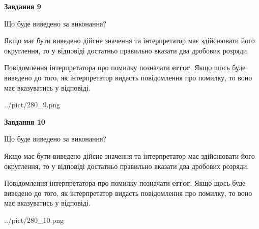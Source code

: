 \documentclass[12pt, ukrainian]{article}
\begin{document}
{\begin {Large}
{\begin {center}\textbf{Завдання 9}\end {center}}\par
Що буде виведено за виконання? \par

Якщо має бути виведено дійсне значення та інтерпретатор має здійснювати його округлення, 
то у відповіді достатньо правильно вказати два дробових розряди.

Повідомлення інтерпретатора про помилку позначати \textbf{error}.
Якщо щось буде виведено до того, як інтерпретатор видасть повідомлення про помилку, 
то воно має вказуватись у відповіді. \par

\begin{center}
	{../pict/280_9.png}
\end{center}
\newpage

{\begin {center}\textbf{Завдання 10}\end {center}}\par
Що буде виведено за виконання? \par

Якщо має бути виведено дійсне значення та інтерпретатор має здійснювати його округлення, 
то у відповіді достатньо правильно вказати два дробових розряди.

Повідомлення інтерпретатора про помилку позначати \textbf{error}.
Якщо щось буде виведено до того, як інтерпретатор видасть повідомлення про помилку, 
то воно має вказуватись у відповіді. \par

\begin{center}
	{../pict/280_10.png}
\end{center}
\newpage

\end {Large}}
\end{document}
